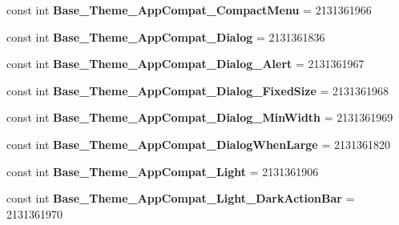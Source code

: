 \begin{DoxyCompactItemize}
const int {\bfseries Base\+\_\+\+Theme\+\_\+\+App\+Compat\+\_\+\+Compact\+Menu} = 2131361966
\item 
\mbox{\label{class_sample_app_1_1_droid_1_1_resource_1_1_style_aa2f24537fec6ebcefb360e8e02694d54}} 
const int {\bfseries Base\+\_\+\+Theme\+\_\+\+App\+Compat\+\_\+\+Dialog} = 2131361836
\item 
\mbox{\label{class_sample_app_1_1_droid_1_1_resource_1_1_style_aa6a67dbc6c8018a95a95119859f99c42}} 
const int {\bfseries Base\+\_\+\+Theme\+\_\+\+App\+Compat\+\_\+\+Dialog\+\_\+\+Alert} = 2131361967
\item 
\mbox{\label{class_sample_app_1_1_droid_1_1_resource_1_1_style_afb2613a288cb1ae984c711f358ca592d}} 
const int {\bfseries Base\+\_\+\+Theme\+\_\+\+App\+Compat\+\_\+\+Dialog\+\_\+\+Fixed\+Size} = 2131361968
\item 
\mbox{\label{class_sample_app_1_1_droid_1_1_resource_1_1_style_acd81699a5884a4a261c88e7ca3de6cc0}} 
const int {\bfseries Base\+\_\+\+Theme\+\_\+\+App\+Compat\+\_\+\+Dialog\+\_\+\+Min\+Width} = 2131361969
\item 
\mbox{\label{class_sample_app_1_1_droid_1_1_resource_1_1_style_a35c3c1e372ef618d40e2ec0d337be127}} 
const int {\bfseries Base\+\_\+\+Theme\+\_\+\+App\+Compat\+\_\+\+Dialog\+When\+Large} = 2131361820
\item 
\mbox{\label{class_sample_app_1_1_droid_1_1_resource_1_1_style_ad4cf098fa29929ca50ee3b7dc5add8dc}} 
const int {\bfseries Base\+\_\+\+Theme\+\_\+\+App\+Compat\+\_\+\+Light} = 2131361906
\item 
\mbox{\label{class_sample_app_1_1_droid_1_1_resource_1_1_style_a3800d694912103c9a0eef1e1cbca06d0}} 
const int {\bfseries Base\+\_\+\+Theme\+\_\+\+App\+Compat\+\_\+\+Light\+\_\+\+Dark\+Action\+Bar} = 2131361970
\item 
\mbox{\label{class_sample_app_1_1_droid_1_1_resource_1_1_style_a3f41419250808addcf474a2d6a040622}} 

\end{DoxyCompactItemize}
